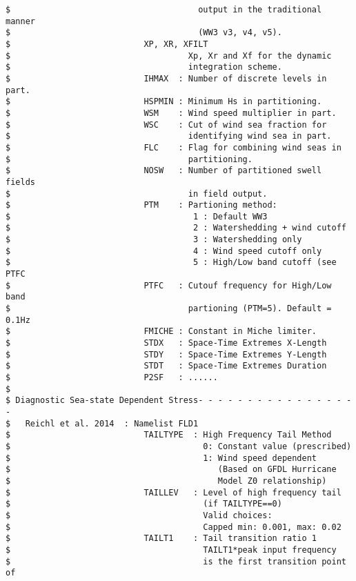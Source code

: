 \begin{footnotesize}
\begin{verbatim}
$                                      output in the traditional manner
$                                      (WW3 v3, v4, v5).
$                           XP, XR, XFILT
$                                    Xp, Xr and Xf for the dynamic
$                                    integration scheme.
$                           IHMAX  : Number of discrete levels in part.
$                           HSPMIN : Minimum Hs in partitioning.
$                           WSM    : Wind speed multiplier in part.
$                           WSC    : Cut of wind sea fraction for
$                                    identifying wind sea in part.
$                           FLC    : Flag for combining wind seas in
$                                    partitioning.
$                           NOSW   : Number of partitioned swell fields
$                                    in field output.
$                           PTM    : Partioning method:
$                                     1 : Default WW3
$                                     2 : Watershedding + wind cutoff
$                                     3 : Watershedding only
$                                     4 : Wind speed cutoff only
$                                     5 : High/Low band cutoff (see PTFC
$                           PTFC   : Cutouf frequency for High/Low band
$                                    partioning (PTM=5). Default = 0.1Hz
$                           FMICHE : Constant in Miche limiter.
$                           STDX   : Space-Time Extremes X-Length
$                           STDY   : Space-Time Extremes Y-Length
$                           STDT   : Space-Time Extremes Duration
$                           P2SF   : ......
$
$ Diagnostic Sea-state Dependent Stress- - - - - - - - - - - - - - - - -
$   Reichl et al. 2014  : Namelist FLD1
$                           TAILTYPE  : High Frequency Tail Method
$                                       0: Constant value (prescribed)
$                                       1: Wind speed dependent
$                                          (Based on GFDL Hurricane
$                                          Model Z0 relationship)
$                           TAILLEV   : Level of high frequency tail 
$                                       (if TAILTYPE==0)
$                                       Valid choices:
$                                       Capped min: 0.001, max: 0.02
$                           TAILT1    : Tail transition ratio 1
$                                       TAILT1*peak input frequency
$                                       is the first transition point of

\end{verbatim}
\end{footnotesize}
